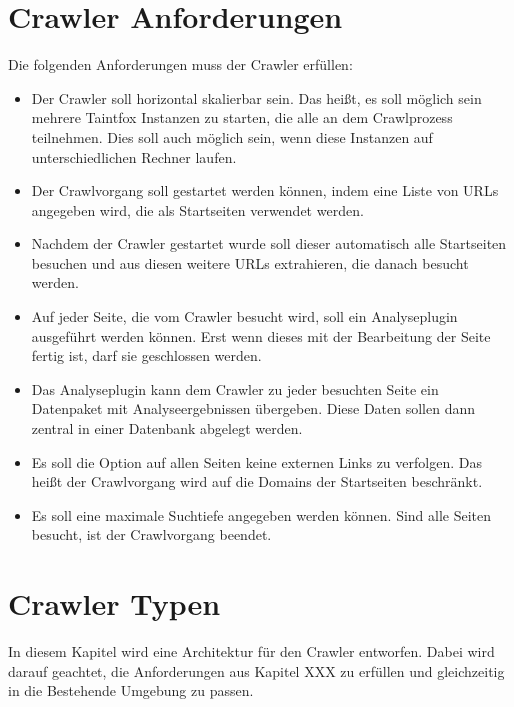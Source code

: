 \section{Crawler Anforderungen}
Die folgenden Anforderungen muss der Crawler erfüllen:
\begin{itemize}
	\item Der Crawler soll horizontal skalierbar sein. Das heißt, es soll möglich sein mehrere Taintfox Instanzen zu starten, die alle an dem Crawlprozess teilnehmen. Dies soll auch möglich sein, wenn diese Instanzen auf unterschiedlichen Rechner laufen.
	\item Der Crawlvorgang soll gestartet werden können, indem eine Liste von URLs angegeben wird, die als Startseiten verwendet werden.
	\item Nachdem der Crawler gestartet wurde soll dieser automatisch alle Startseiten besuchen und aus diesen weitere URLs extrahieren, die danach besucht werden.
	\item Auf jeder Seite, die vom Crawler besucht wird, soll ein Analyseplugin ausgeführt werden können. Erst wenn dieses mit der Bearbeitung der Seite fertig ist, darf sie geschlossen werden.
	\item Das Analyseplugin kann dem Crawler zu jeder besuchten Seite ein Datenpaket mit Analyseergebnissen übergeben. Diese Daten sollen dann zentral in einer Datenbank abgelegt werden.
	\item Es soll die Option auf allen Seiten keine externen Links zu verfolgen. Das heißt der Crawlvorgang wird auf die Domains der Startseiten beschränkt.
	\item Es soll eine maximale Suchtiefe angegeben werden können. Sind alle Seiten besucht, ist der Crawlvorgang beendet.	
\end{itemize}

\section{Crawler Typen}
In diesem Kapitel wird eine Architektur für den Crawler entworfen. Dabei wird darauf geachtet, die Anforderungen aus Kapitel XXX zu erfüllen und gleichzeitig in die Bestehende Umgebung zu passen.

